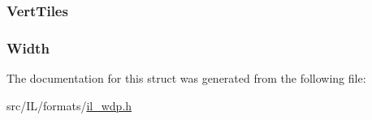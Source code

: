 \hypertarget{struct_w_d_p_i_m_g_h_e_a_d_a7c370437eb4201894bacf3152cd6e5eb}{
\subsubsection[{Vert\-Tiles}]{ Vert\-Tiles}}\label{struct_w_d_p_i_m_g_h_e_a_d_a7c370437eb4201894bacf3152cd6e5eb}
\hypertarget{struct_w_d_p_i_m_g_h_e_a_d_a4146e7b2b0b4097e0e335f9b348392bf}{
\subsubsection[{Width}]{ Width}}\label{struct_w_d_p_i_m_g_h_e_a_d_a4146e7b2b0b4097e0e335f9b348392bf}


The documentation for this struct was generated from the following file\-:\begin{DoxyCompactItemize}
\item 
src/\-I\-L/formats/\hyperlink{il__wdp_8h}{il\-\_\-wdp.\-h}\end{DoxyCompactItemize}
